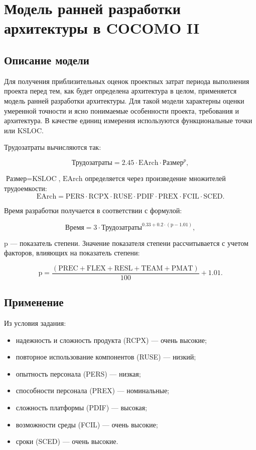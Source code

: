 \section{Модель ранней разработки архитектуры в COCOMO II}

\subsection{Описание модели}

Для получения приблизительных оценок проектных затрат периода выполнения проекта перед тем, как будет определена архитектура в целом, применяется модель ранней разработки архитектуры. Для такой модели характерны  оценки умеренной точности и ясно понимаемые особенности проекта, требования и архитектура. В качестве единиц измерения используются функциональные точки или KSLOC. 

Трудозатраты вычисляются так:

$$\text{Трудозатраты} = 2.45 \cdot \text{EArch} \cdot \text{Размер}^p,$$

 $\text{Размер} = \text{KSLOC}$, $\text{EArch}$ определяется через произведение множителей трудоемкости:
$$\text{EArch} = \text{PERS} \cdot \text{RCPX} \cdot \text{RUSE} \cdot \text{PDIF} \cdot \text{PREX} \cdot \text{FCIL} \cdot \text{SCED}.$$

Время разработки получается в соответствии с формулой:

$$\text{Время} = 3 \cdot \text{Трудозатраты}^{0.33 + 0.2 \cdot (\text{p} - 1.01)},$$

 $\text{p}$ --- показатель степени. Значение показателя степени рассчитывается с учетом факторов, влияющих на показатель степени:

$$\text{p} = \frac{(\text{PREC} + \text{FLEX} + \text{RESL} + \text{TEAM} + \text{PMAT})}{100} + 1.01.$$

\subsection{Применение}

Из условия задания:

\begin{itemize}
    \item надежность и сложность продукта (RCPX) --- очень высокие;
    \item повторное использование компонентов (RUSE) --- низкий;
    \item опытность персонала (PERS) --- низкая;
    \item способности персонала (PREX) --- номинальные;
    \item сложность платформы (PDIF) --- высокая;
    \item возможности среды (FCIL) --- очень высокие;
    \item сроки (SCED) --- очень высокие.
\end{itemize}


